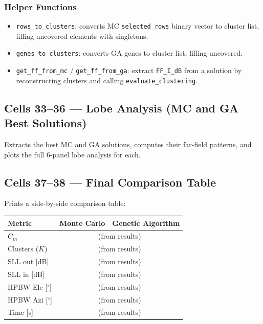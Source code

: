 \documentclass[11pt,a4paper]{article}
\begin{document}
\subsubsection{Helper Functions}
\begin{itemize}
    \item \texttt{rows\_to\_clusters}: converts MC \texttt{selected\_rows} binary vector
          to cluster list, filling uncovered elements with singletons.
    \item \texttt{genes\_to\_clusters}: converts GA genes to cluster list, filling uncovered.
    \item \texttt{get\_ff\_from\_mc} / \texttt{get\_ff\_from\_ga}: extract \texttt{FF\_I\_dB}
          from a solution by reconstructing clusters and calling \texttt{evaluate\_clustering}.
\end{itemize}

\subsection{Cells 33--36 --- Lobe Analysis (MC and GA Best Solutions)}

Extracts the best MC and GA solutions, computes their far-field patterns,
and plots the full 6-panel lobe analysis for each.

\subsection{Cells 37--38 --- Final Comparison Table}

Prints a side-by-side comparison table:

\begin{center}
\begin{tabular}{lcc}
\toprule
\textbf{Metric} & \textbf{Monte Carlo} & \textbf{Genetic Algorithm} \\
\midrule
$C_m$ & \multicolumn{2}{c}{(from results)} \\
Clusters ($K$) & \multicolumn{2}{c}{(from results)} \\
SLL out [dB] & \multicolumn{2}{c}{(from results)} \\
SLL in [dB] & \multicolumn{2}{c}{(from results)} \\
HPBW Ele [$^\circ$] & \multicolumn{2}{c}{(from results)} \\
HPBW Azi [$^\circ$] & \multicolumn{2}{c}{(from results)} \\
Time [s] & \multicolumn{2}{c}{(from results)} \\
\bottomrule
\end{tabular}
\end{center}
\end{document}
